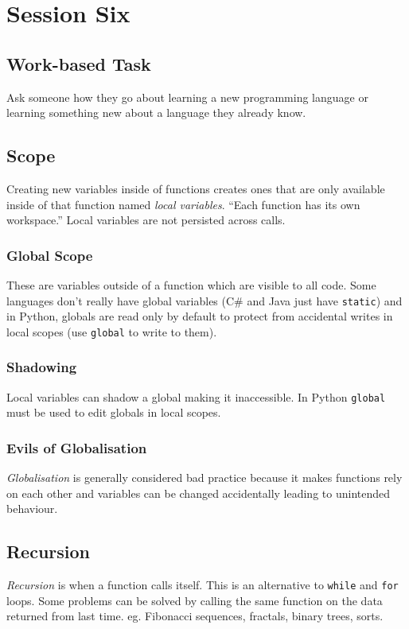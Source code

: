 \section{Session Six}\label{sec:session_six}

\subsection{Work-based Task}\label{sub:work_based_task}

Ask someone how they go about learning a new programming language or learning something new about a language they already know.

\subsection{Scope}\label{sub:scope}

Creating new variables inside of functions creates ones that are only available inside of that function named \emph{local variables}.
``Each function has its own workspace.''
Local variables are not persisted across calls.

\subsubsection{Global Scope}\label{ssub:global_scope}

These are variables outside of a function which are visible to all code.
Some languages don't really have global variables (C\# and Java just have \texttt{static}) and in Python, globals are read only by default to protect from accidental writes in local scopes (use \texttt{global} to write to them).

\subsubsection{Shadowing}\label{ssub:shadowing}

Local variables can shadow a global making it inaccessible.
In Python \texttt{global} must be used to edit globals in local scopes.

\subsubsection{Evils of Globalisation}\label{ssub:evils_of_glovalisation}

\emph{Globalisation} is generally considered bad practice because it makes functions rely on each other and variables can be changed accidentally leading to unintended behaviour.

\subsection{Recursion}\label{sub:recursion}

\emph{Recursion} is when a function calls itself.
This is an alternative to \texttt{while} and \texttt{for} loops.
Some problems can be solved by calling the same function on the data returned from last time.
eg. Fibonacci sequences, fractals, binary trees, sorts.

